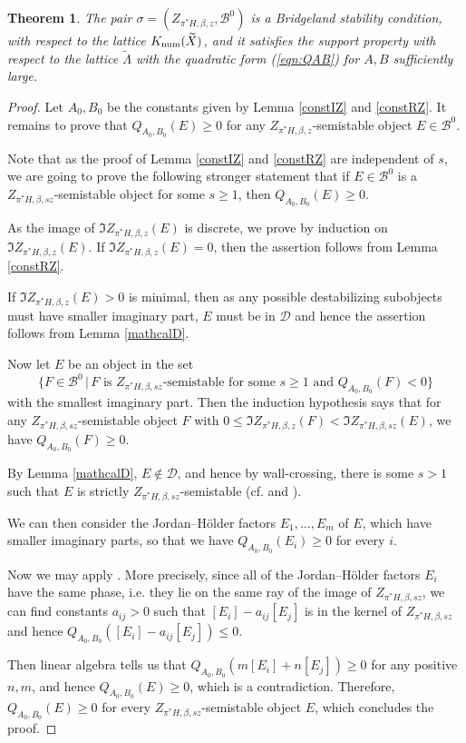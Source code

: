 \documentclass[12pt]{amsart}
\newtheorem{theorem}{Theorem}[section]
\theoremstyle{definition}
\DeclareMathOperator{\num}{num}
\begin{document}
\begin{theorem}\label{mainSect5}
The pair $\sigma = (Z_{\pi^\ast H,\beta,z}, \mathcal{B}^0)$ is a Bridgeland stability condition, 
with respect to the lattice ${\rm K}_{\num}(\widetilde{X})$,
and it satisfies the support property with respect to the lattice $\widetilde{\Lambda}$ with the quadratic form (\ref{eqn:QAB}) for $A,B$ sufficiently large.
\end{theorem}
\begin{proof}
Let $A_0,B_0$ be the constants given by Lemma \ref{constIZ} and \ref{constRZ}.
It remains to prove that $Q_{A_0,B_0}(E) \geq 0$ for any $Z_{\pi^\ast H,\beta,z}$-semistable object $E \in \mathcal{B}^0$. 

Note that as the proof of Lemma \ref{constIZ} and \ref{constRZ} are independent of $s$,
we are going to prove the following stronger statement that if $E \in \mathcal{B}^0$ is a $Z_{\pi^\ast H,\beta,sz}$-semistable object for some $s \geq 1$, then $Q_{A_0,B_0}(E) \geq 0$.

As the image of $\Im Z_{\pi^\ast H,\beta,z}(E)$ is discrete,
we prove by induction on $\Im Z_{\pi^\ast H,\beta,z}(E)$.
If $\Im Z_{\pi^\ast H,\beta,z}(E)=0$, 
then the assertion follows from Lemma \ref{constRZ}.

If $\Im Z_{\pi^\ast H,\beta,z}(E)>0$ is minimal,
then as any possible destabilizing subobjects must have smaller imaginary part,
$E$ must be in $\mathcal{D}$ and hence the assertion follows from Lemma \ref{mathcalD}.

Now let $E$ be an object in the set \[\{F \in \mathcal{B}^0 \, | \, F  \text{ is } Z_{\pi^\ast H,\beta,sz}\text{-semistable for some } s\geq1 \text{ and }Q_{A_0,B_0}(F)<0 \}\] with the smallest imaginary part.
Then the induction hypothesis says that for any $Z_{\pi^\ast H,\beta,sz}$-semistable object $F$ with $0 \leq \Im Z_{\pi^\ast H,\beta,z}(F)<\Im Z_{\pi^\ast H,\beta,sz}(E)$,
we have $Q_{A_0,B_0}(F) \geq 0$.

By Lemma \ref{mathcalD}, $E \notin \mathcal{D}$,
and hence by wall-crossing,
there is some $s>1$ such that $E$ is strictly $Z_{\pi^\ast H,\beta,sz}$-semistable
(cf. \cite[Theorem 3.5]{BMS16} and \cite[Sect. 9]{Bri08}).

We can then consider the Jordan--Hölder factors $E_1, \dots, E_m$ of $E$, which have smaller imaginary parts,
so that we have $Q_{A_0,B_0}(E_i)\geq 0$ for every $i$.

Now we may apply \cite[Lemma A.6]{BMS16}.
More precisely, since all of the Jordan--Hölder factors $E_i$ have the same phase, i.e. they lie on the same ray of the image of $Z_{\pi^\ast H,\beta,sz}$,
we can find constants
$a_{ij} > 0$ such that $[E_i] - a_{ij}[E_j]$ is in the kernel of $Z_{\pi^\ast H,\beta,sz}$ and hence $Q_{A_0,B_0}([E_i]-a_{ij}[E_j]) \leq 0$.

Then linear algebra tells us that $Q_{A_0,B_0}(m[E_i] + n[E_j] ) \geq 0$ for any positive $n, m$, and hence $Q_{A_0,B_0}(E) \geq 0$,
which is a contradiction.
Therefore, $Q_{A_0,B_0}(E) \geq 0$ for every $Z_{\pi^\ast H,\beta,sz}$-semistable object $E$,
which concludes the proof.
\end{proof}
\end{document}
